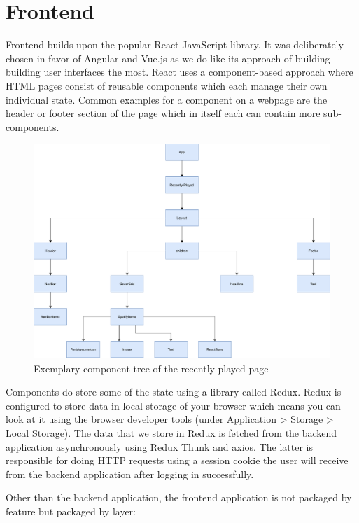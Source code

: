 \section{Frontend}

Frontend builds upon the popular React JavaScript library. It was deliberately chosen in favor of Angular and Vue.js as we do like its approach of building building user interfaces the most. React uses a component-based approach where \acs{HTML} pages consist of reusable components which each manage their own individual state. Common examples for a component on a webpage are the header or footer section of the page which in itself each can contain more sub-components.

\begin{figure}[bth]
    \centering
    \includegraphics[width=1.0\textwidth]{Graphics/Chapter3/frontend-component-tree.pdf}
    \caption{Exemplary component tree of the recently played page}
\end{figure}

Components do store some of the state using a library called Redux. Redux is configured to store data in local storage of your browser which means you can look at it using the browser developer tools (under Application > Storage > Local Storage). The data that we store in Redux is fetched from the backend application asynchronously using Redux Thunk and axios. The latter is responsible for doing \ac{HTTP} requests using a session cookie the user will receive from the backend application after logging in successfully.

Other than the backend application, the frontend application is not packaged by feature but packaged by layer:

